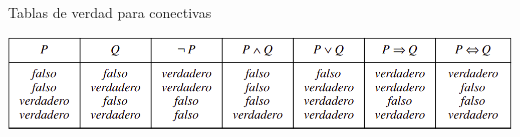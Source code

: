 \begin{frame}{Tablas de verdad para conectivas}
    
    \centering
    \includegraphics[width=1\textwidth]{34_images_table.png}
    
\end{frame}
